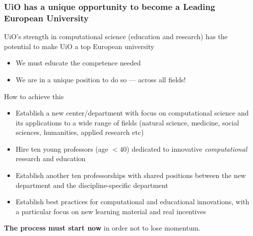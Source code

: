 \documentclass{beamer}
\begin{document}
\begin{frame}
\frametitle{UiO has a unique opportunity to become a Leading European University}

\begin{block}{}
UiO's strength in computational science (education and research)
has the potential to make UiO a top European university

\begin{itemize}
\item We must educate the competence needed

\item We are in a unique position to do so --- across all fields!
\end{itemize}

\noindent
\end{block}

\begin{block}{How to achieve this }
\begin{itemize}
\item Establish  a new center/department with focus on computational science and its applications to a wide range of fields (natural science, medicine, social sciences, humanities, applied research etc)

\item Hire ten young professors (age $< 40$) dedicated to innovative \emph{computational} research and education

\item Establish another ten professorships with  shared positions between the  new department and the discipline-specific department

\item Establish  best practices for computational and educational innovations, with a particular focus on  new learning material and real incentives
\end{itemize}

\noindent
\end{block}

\textbf{The process must start now} in order not to lose momentum.
\end{frame}
\end{document}
